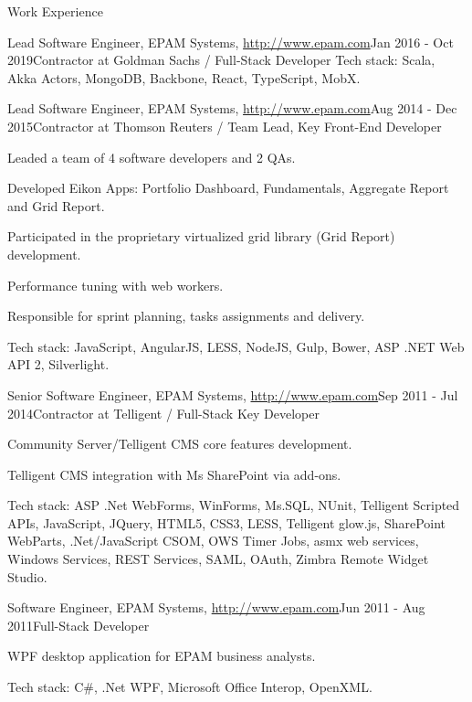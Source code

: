 \documentclass{resume}
\begin{document}
\begin{rSection}{Work Experience}
\begin{rSubsection}{Lead Software Engineer, EPAM Systems, \url{http://www.epam.com}}{Jan 2016 - Oct 2019}{Contractor at Goldman Sachs / Full-Stack Developer}{}
Tech stack: Scala, Akka Actors, MongoDB, Backbone, React, TypeScript, MobX.
\end{rSubsection}


\begin{rSubsection}{Lead Software Engineer, EPAM Systems, \url{http://www.epam.com}}{Aug 2014 - Dec 2015}{Contractor at Thomson Reuters / Team Lead, Key Front-End Developer}{}
\item Leaded a team of 4 software developers and 2 QAs.
\item Developed Eikon Apps: Portfolio Dashboard, Fundamentals, Aggregate Report and Grid Report.
\item Participated in the proprietary virtualized grid library (Grid Report) development.
\item Performance tuning with web workers.
\item Responsible for sprint planning, tasks assignments and delivery.

Tech stack: JavaScript, AngularJS, LESS, NodeJS, Gulp, Bower, ASP .NET Web API 2, Silverlight.
\end{rSubsection}

\begin{rSubsection}{Senior Software Engineer, EPAM Systems, \url{http://www.epam.com}}{Sep 2011 - Jul 2014}{Contractor at Telligent / Full-Stack Key Developer}{}
\item Community Server/Telligent CMS core features development.
\item Telligent CMS integration with Ms SharePoint via add-ons.

Tech stack:  ASP .Net WebForms, WinForms, Ms.SQL, NUnit, Telligent Scripted APIs, JavaScript, JQuery, HTML5,
CSS3, LESS, Telligent glow.js, SharePoint WebParts, .Net/JavaScript CSOM, OWS Timer Jobs, asmx web
services, Windows Services, REST Services, SAML, OAuth, Zimbra Remote Widget Studio.
\end{rSubsection}


\begin{rSubsection}{Software Engineer, EPAM Systems, \url{http://www.epam.com}}{Jun 2011 - Aug 2011}{Full-Stack Developer}{}
\item WPF desktop application for EPAM business analysts.

Tech stack: C\#, .Net WPF, Microsoft Office Interop, OpenXML.
\end{rSubsection}

\end{rSection}

\end{document}
